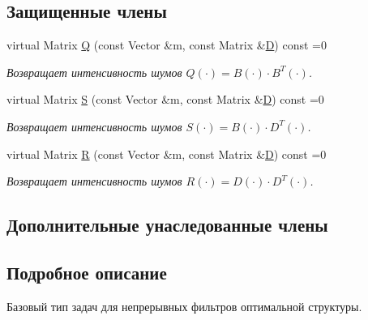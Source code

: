 \subsection*{Защищенные члены}
\begin{DoxyCompactItemize}
\item 
\hypertarget{class_core_1_1_continuous_task_a8b3712283fb6a46c8c778c9e4f2045e2}{}\label{class_core_1_1_continuous_task_a8b3712283fb6a46c8c778c9e4f2045e2} 
virtual Matrix \hyperlink{class_core_1_1_continuous_task_a8b3712283fb6a46c8c778c9e4f2045e2}{Q} (const Vector \&m, const Matrix \&\hyperlink{class_core_1_1_continuous_task_ac792d0a5d2487a30f9eb360344675173}{D}) const =0
\begin{DoxyCompactList}\small\item\em Возвращает интенсивность шумов $Q(\cdot) = B(\cdot) \cdot B^T(\cdot)$. \end{DoxyCompactList}\item 
virtual Matrix \hyperlink{class_core_1_1_continuous_task_aa6d652b655628586aeeda03348f633c5}{S} (const Vector \&m, const Matrix \&\hyperlink{class_core_1_1_continuous_task_ac792d0a5d2487a30f9eb360344675173}{D}) const =0
\begin{DoxyCompactList}\small\item\em Возвращает интенсивность шумов $S(\cdot) = B(\cdot) \cdot D^T(\cdot)$. \end{DoxyCompactList}\item 
\hypertarget{class_core_1_1_continuous_task_ad98bb1adf1e394cac3f0bdead365f95a}{}\label{class_core_1_1_continuous_task_ad98bb1adf1e394cac3f0bdead365f95a} 
virtual Matrix \hyperlink{class_core_1_1_continuous_task_ad98bb1adf1e394cac3f0bdead365f95a}{R} (const Vector \&m, const Matrix \&\hyperlink{class_core_1_1_continuous_task_ac792d0a5d2487a30f9eb360344675173}{D}) const =0
\begin{DoxyCompactList}\small\item\em Возвращает интенсивность шумов $R(\cdot) = D(\cdot) \cdot D^T(\cdot)$. \end{DoxyCompactList}\end{DoxyCompactItemize}
\subsection*{Дополнительные унаследованные члены}


\subsection{Подробное описание}
Базовый тип задач для непрерывных фильтров оптимальной структуры. 

